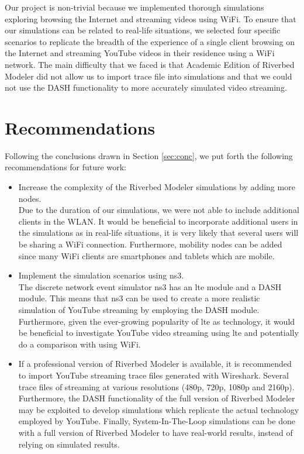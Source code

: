 Our project is non-trivial because we implemented thorough simulations exploring browsing the Internet and streaming videos using \gls{WiFi}. To ensure that our simulations can be related to real-life situations, we selected four specific scenarios to replicate the breadth of the experience of a single client browsing on the Internet and streaming YouTube videos in their residence using a \gls{WiFi} network. The main difficulty that we faced is that Academic Edition of Riverbed Modeler did not allow us to import trace file into simulations and that we could not use the \gls{DASH} functionality to more accurately simulated video streaming.

\section{Recommendations} \label{sec:recommendations}
Following the conclusions drawn in Section \ref{sec:conc}, we put forth the following recommendations for future work:
\begin{itemize}
	\item Increase the complexity of the Riverbed Modeler simulations by adding more nodes. \\
	Due to the duration of our simulations, we were not able to include additional clients in the \gls{WLAN}. It would be beneficial to incorporate additional users in the simulations as in real-life situations, it is very likely that several users will be sharing a \gls{WiFi} connection. Furthermore, mobility nodes can be added since many \gls{WiFi} clients are smartphones and tablets which are mobile.	
	
	\item Implement the simulation scenarios using \gls{ns3}. \\ 
	The discrete network event simulator \gls{ns3} has an \gls{lte} module and a \gls{DASH} module. This means that \gls{ns3} can be used to create a more realistic simulation of YouTube streaming by employing the \gls{DASH} module. Furthermore, given the ever-growing popularity of \gls{lte} as technology, it would be beneficial to investigate YouTube video streaming using \gls{lte} and potentially do a comparison with using \gls{WiFi}.
	
	\item If a professional version of Riverbed Modeler is available, it is recommended to import YouTube streaming trace files generated with Wireshark. Several trace files of streaming at various resolutions (480p, 720p, 1080p and 2160p). Furthermore, the \gls{DASH} functionality of the full version of Riverbed Modeler may be exploited to develop simulations which replicate the actual technology employed by YouTube. Finally, System-In-The-Loop simulations can be done with a full version of Riverbed Modeler to have real-world results, instead of relying on simulated results.	
	
\end{itemize}


